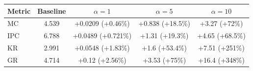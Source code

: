 \begin{tabular}{lcccc}
\toprule
Metric & Baseline & $\alpha=1$ & $\alpha=5$ & $\alpha=10$ \\
\midrule
MC & 4.539 & +0.0209 (+0.46\%) & +0.838 (+18.5\%) & +3.27 (+72\%) \\
IPC & 6.788 & +0.0489 (+0.721\%) & +1.31 (+19.3\%) & +4.65 (+68.5\%) \\
KR & 2.991 & +0.0548 (+1.83\%) & +1.6 (+53.4\%) & +7.51 (+251\%) \\
GR & 4.714 & +0.12 (+2.56\%) & +3.53 (+75\%) & +16.4 (+348\%) \\
\bottomrule
\end{tabular}
